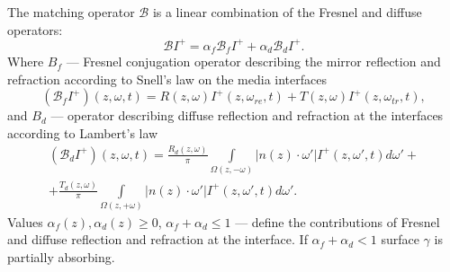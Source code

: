 \documentclass[12pt,reqno]{report}
\begin{document}
The matching operator $\mathcal B$ is a linear combination of the Fresnel and diffuse operators:
\begin{equation}
\mathcal BI^+ = \alpha_f \mathcal B_{f}I^+ + \alpha_d \mathcal
B_{d}I^+.
\end{equation}
Where $B_{f}$ ---  Fresnel conjugation operator describing the mirror reflection and refraction according to Snell's law on the media interfaces  \cite{20,22,29,31,33}
\begin{equation}
(\mathcal B_{f}I^+)(z,\omega,t) = R(z,\omega)
I^+(z,\omega_{re},t) + T(z,\omega) I^+(z,\omega_{tr},t),
\end{equation}
and         $B_{d}$ ---  operator describing diffuse reflection and refraction \cite{30,32} at the interfaces according to Lambert's law  
\begin{multline}
(\mathcal B_d I^+)(z,\omega,t) = \frac{R_d (z,\omega)}{\pi}\int
\limits_{\Omega(z,-\omega)}|n(z)\cdot \omega'| I^+(z,\omega',t)d
\omega' + \\+ \frac{T_d (z,\omega)}{\pi} \int
\limits_{\Omega(z,+\omega)}|n(z)\cdot \omega'| I^+(z,\omega',t) d
\omega'.
\end{multline}
Values $ \alpha_f(z),\alpha_d(z) \geq 0$, $ \alpha_f +\alpha_d \leq 1$  --- define the contributions 
of Fresnel and diffuse reflection and refraction at the interface. 
If $\alpha_f +\alpha_d < 1$ surface $\gamma$ is partially absorbing.
\end{document}
